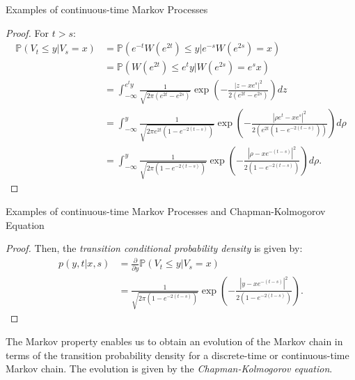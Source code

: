 \documentclass[aspectratio=169,xcolor=dvipsnames]{beamer}
\begin{document}
\begin{frame}{Examples of continuous-time Markov Processes}
    \begin{proof}
        For $t > s$:
        \begin{align*}
        \mathbb{P}(V_t \leq y | V_s = x) &= \mathbb{P}(e^{-t} W(e^{2t}) \leq y | e^{-s} W(e^{2s}) = x) \\
        &= \mathbb{P}(W(e^{2t}) \leq e^t y | W(e^{2s}) = e^s x) \\
        &= \int_{-\infty}^{e^t y} \frac{1}{\sqrt{2\pi (e^{2t} - e^{2s})}} 
        \exp\left( -\frac{|z - x e^s|^2}{2(e^{2t} - e^{2s})} \right) dz \\
        &= \int_{-\infty}^{y} \frac{1}{\sqrt{2\pi e^{2t} (1 - e^{-2(t-s)})}} 
        \exp\left( -\frac{| \rho e^t - x e^s |^2}{2(e^{2t} (1 - e^{-2(t-s)}))} \right) d\rho \\
        &= \int_{-\infty}^{y} \frac{1}{\sqrt{2\pi (1 - e^{-2(t-s)})}} 
        \exp\left( -\frac{| \rho - x e^{-(t-s)} |^2}{2(1 - e^{-2(t-s)})} \right) d\rho.
        \end{align*}
    \end{proof}
\end{frame}


\begin{frame}{Examples of continuous-time Markov Processes and Chapman-Kolmogorov Equation}
    \begin{proof}
        Then, the \textit{transition conditional probability density} is given by:
        \begin{align*}
            p(y,t|x,s) &= \frac{\partial}{\partial y} \mathbb{P}\left( V_t \leq y | V_s = x \right)\\
            &= \frac{1}{\sqrt{2\pi (1 - e^{-2(t-s)})}} \exp\left( -\frac{|y - x e^{-(t-s)}|^2}{2(1 - e^{-2(t-s)})} \right).
        \end{align*}
    \end{proof}
    The Markov property enables us to obtain an evolution of the Markov chain in terms of the transition probability density for a discrete-time or continuous-time Markov chain. The evolution is given by the \textit{Chapman-Kolmogorov equation}.
\end{frame}

\end{document}
